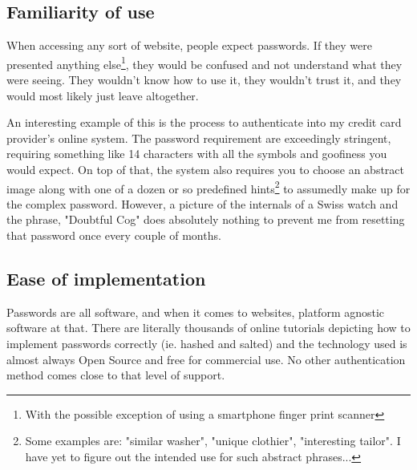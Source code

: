 \documentclass[conference]{IEEEtran}
\begin{document}
\subsection{Familiarity of use}
	When accessing any sort of website, people expect passwords. If they were presented anything else\footnote{With the possible exception of using a smartphone finger print scanner}, they would be confused and not understand what they were seeing. They wouldn't know how to use it, they wouldn't trust it, and they would most likely just leave altogether. 

	An interesting example of this is the process to authenticate into my credit card provider's online system. The password requirement are exceedingly stringent, requiring something like 14 characters with all the symbols and goofiness you would expect. On top of that, the system also requires you to choose an abstract image along with one of a dozen or so predefined hints\footnote{Some examples are: "similar washer", "unique clothier", "interesting tailor". I have yet to figure out the intended use for such abstract phrases...} to assumedly make up for the complex password. However, a picture of the internals of a Swiss watch and the phrase, "Doubtful Cog" does absolutely nothing to prevent me from resetting that password once every couple of months.
\subsection{Ease of implementation}
	Passwords are all software, and when it comes to websites, platform agnostic software at that. There are literally thousands of online tutorials depicting how to implement passwords correctly (ie. hashed and salted) and the technology used is almost always Open Source and free for commercial use. No other authentication method comes close to that level of support.
\end{document}
